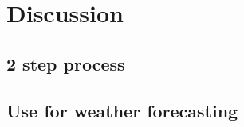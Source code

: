 \section{Discussion}
\label{sec:discussion}

\subsection{2 step process}

\subsection{Use for weather forecasting}